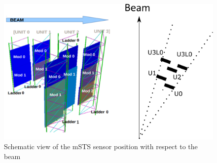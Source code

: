 \begin{figure}[!h]
\centering
\includegraphics[width=0.65\columnwidth]{Chapter6/DCS/images/msts_sensors_scheme2.png}
\caption{Schematic view of the \gls{mSTS} sensor position with respect to the beam}
\label{fig_sensors_scheme}
\end{figure}
\newpage
